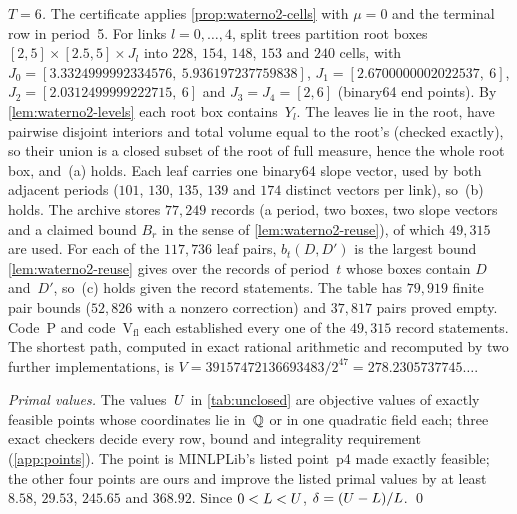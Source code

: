 \emph{$T=6$.}
The certificate applies \cref{prop:waterno2-cells} with $\mu=0$ and the terminal row in period~5.
For links $l=0,\dots,4$, split trees partition root boxes $[2,5]\times[2.5,5]\times J_l$ into $228$, $154$, $148$, $153$ and $240$ cells, with $J_0=[3.3324999992334576,\ 5.936197237759838]$, $J_1=[2.6700000002022537,\ 6]$, $J_2=[2.0312499999222715,\ 6]$ and $J_3=J_4=[2,6]$ (binary64 end points).
By \cref{lem:waterno2-levels} each root box contains~$Y_l$.
The leaves lie in the root, have pairwise disjoint interiors and total volume equal to the root's (checked exactly), so their union is a closed subset of the root of full measure, hence the whole root box, and~(a) holds.
Each leaf carries one binary64 slope vector, used by both adjacent periods ($101$, $130$, $135$, $139$ and $174$ distinct vectors per link), so~(b) holds.
The archive stores $77{,}249$ records (a period, two boxes, two slope vectors and a claimed bound $B_r$ in the sense of \cref{lem:waterno2-reuse}), of which $49{,}315$ are used.
For each of the $117{,}736$ leaf pairs, $b_t(D,D')$ is the largest bound \cref{lem:waterno2-reuse} gives over the records of period~$t$ whose boxes contain $D$ and~$D'$, so~(c) holds given the record statements.
The table has $79{,}919$ finite pair bounds ($52{,}826$ with a nonzero correction) and $37{,}817$ pairs proved empty.
Code~P and code~V$_{\mathrm{fl}}$ each established every one of the $49{,}315$ record statements.
The shortest path, computed in exact rational arithmetic and recomputed by two further implementations, is $V=39157472136693483/2^{47}=278.2305737745\ldots$.

\emph{Primal values.}
The values~$U$ in \cref{tab:unclosed} are objective values of exactly feasible points whose coordinates lie in~$\mathbb{Q}$ or in one quadratic field each; three exact checkers decide every row, bound and integrality requirement (\cref{app:points}).
The  point is MINLPLib's listed point~p4 made exactly feasible; the other four points are ours and improve the listed primal values by at least $8.58$, $29.53$, $245.65$ and $368.92$.
Since $0<L<U$, $\delta=(U-L)/L$.
\qed

